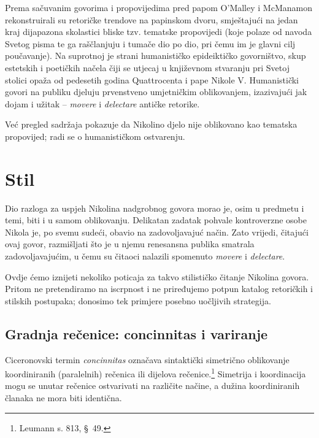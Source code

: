 \documentclass[a5paper,twoside]{article}
\begin{document}
Prema sačuvanim govorima i propovijedima pred papom O'Malley i McManamon rekonstruirali su retoričke trendove na papinskom dvoru, smještajući na jedan kraj dijapazona skolastici bliske tzv. tematske propovijedi (koje polaze od navoda Svetog pisma te ga raščlanjuju i tumače dio po dio, pri čemu im je glavni cilj poučavanje). Na suprotnoj je strani humanističko epideiktičko govorništvo, skup estetskih i poetičkih načela čiji se utjecaj u književnom stvaranju pri Svetoj stolici opaža od pedesetih godina Quattrocenta i pape Nikole V. Humanistički govori na publiku djeluju prvenstveno umjetničkim oblikovanjem, izazivajući jak dojam i užitak – \textit{movere} i \textit{delectare} antičke retorike. 

Već pregled sadržaja pokazuje da Nikolino djelo nije oblikovano kao tematska propovijed; radi se o humanističkom ostvarenju.


\section{Stil}


Dio razloga za uspjeh Nikolina nadgrobnog govora morao je, osim u predmetu i temi, biti i u samom oblikovanju. Delikatan zadatak pohvale kontroverzne osobe Nikola je, po svemu sudeći, obavio na zadovoljavajuć način. Zato vrijedi, čitajući ovaj govor, razmišljati što je u njemu renesansna publika smatrala zadovoljavajućim, u čemu su čitaoci nalazili spomenuto \textit{movere} i \textit{delectare}.

Ovdje ćemo iznijeti nekoliko poticaja za takvo stilističko čitanje Nikolina govora. Pritom ne pretendiramo na iscrpnost i ne priređujemo potpun katalog retoričkih i stilskih postupaka; donosimo tek primjere posebno uočljivih strategija.

\subsection{Gradnja rečenice: concinnitas i variranje}

Ciceronovski termin \textit{concinnitas} označava sintaktički simetrično oblikovanje koordiniranih (paralelnih) rečenica ili dijelova rečenice.\footnote{Leumann s. 813, §~49.} Simetrija i koordinacija mogu se unutar rečenice ostvarivati na različite načine, a dužina koordiniranih članaka ne mora biti identična.
\end{document}
